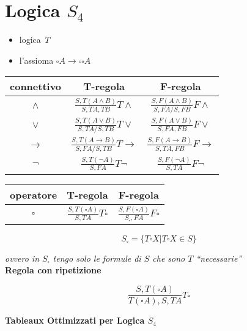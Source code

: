 \documentclass[a4paper,12pt, oneside]{book}
\begin{document}
\section*{Logica $S_4$}
\begin{itemize}
  \item logica \textit{T}
  \item l'assioma $\square A\to \square\square A$
\end{itemize}
\begin{table}[H]
  \Large
  \centering
  \begin{tabular}{c||c|c}
    connettivo& T-regola& F-regola\\
    \hline
    \hline
    $\land$ & $\frac{S,T(A\land B)}{S,TA,TB}T\land$&
                        $\frac{S,F(A\land B)}{S,FA/S,FB}F\land$\\
    \hline
    $\lor$ & $\frac{S,T(A\lor B)}{S,TA/S,TB}T\lor$&
                        $\frac{S,F(A\lor B)}{S,FA,FB}F\lor$\\
    \hline
    $\to$ & $\frac{S,T(A\to B)}{S,FA/S,TB}T\to$&
                        $\frac{S,F(A\to B)}{S,TA,FB}F\to$\\
    \hline
    $\neg$ & $\frac{S,T(\neg A)}{S,FA}T\neg$&
                        $\frac{S,F(\neg A)}{S,TA}F\neg$\\
    \hline
  \end{tabular}
\end{table}
\begin{table}[H]
  \Large
  \centering
  \begin{tabular}{c||c|c}
    operatore& T-regola& F-regola\\
    \hline
    \hline
    $\square$ & $\frac{S,T(\square A)}{S,TA}T\square$&
                        $\frac{S,F(\square A)}{S_\square,FA}F\square$\\
    \hline
  \end{tabular}
\end{table}
\[S_\square=\{T\square X|T\square X\in S\}\]
\begin{center}
  \textit{ovvero in $S_\square$ tengo solo le formule di $S$ che sono $T$
    ``necessarie''}\\
  \textbf{Regola con ripetizione}
\end{center}
\[\frac{S,T(\square A)}{T(\square A),S,TA}T\square\]
\begin{center}
  \textbf{Tableaux Ottimizzati per Logica $S_4$}
\end{center}
\end{document}
